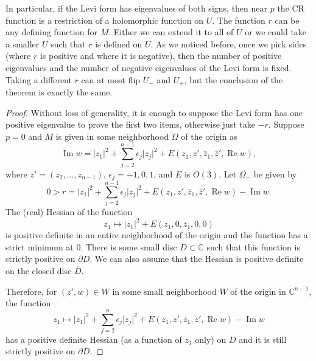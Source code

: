 \documentclass[12pt,openany]{book}
\renewcommand{\Re}{\operatorname{Re}}
\renewcommand{\Im}{\operatorname{Im}}
\newcommand{\sabs}[1]{\lvert {#1} \rvert}
\newcommand{\C}{{\mathbb{C}}}
\theoremstyle{plain}
\theoremstyle{remark}
\theoremstyle{definition}
\theoremstyle{exercise}
\theoremstyle{example}
\begin{document}
In particular, if the Levi form has eigenvalues of both signs,
then near $p$ the CR function is a restriction of a holomorphic
function on $U$.  The function $r$ can be any defining
function for $M$.  Either we can extend it to all of $U$ or we could take a
smaller $U$ such that $r$ is defined on $U$.  As we noticed before,
once we pick sides (where $r$ is positive and where it is negative), then
the number of positive eigenvalues and the number of negative eigenvalues of
the Levi form is fixed.  Taking a different $r$ can at most flip $U_-$
and $U_+$, but the conclusion of the theorem is exactly the same.

\begin{proof}
Without loss of generality, it is enough to suppose the Levi form has one positive eigenvalue to prove the
first two items, otherwise just take $-r$.
Suppose $p = 0$ and $M$ is given in some neighborhood
$\Omega$ of the origin as
\begin{equation*}
\Im w = \sabs{z_1}^2 + \sum_{j=2}^{n-1} \epsilon_j \sabs{z_j}^2 +
E(z_1,z',\bar{z}_1,\bar{z}',\Re w) ,
\end{equation*}
where $z' = (z_2,\ldots,z_{n-1})$, $\epsilon_j = -1,0,1$,
and $E$ is $O(3)$.
Let $\Omega_-$ be given by
\begin{equation*}
0 > r = \sabs{z_1}^2 + \sum_{j=2}^{n-1} \epsilon_j \sabs{z_j}^2 +
E(z_1,z',\bar{z}_1,\bar{z}',\Re w) - \Im w .
\end{equation*}
The (real) Hessian of the function
\begin{equation*}
z_1 \mapsto \sabs{z_1}^2 +
E(z_1,0,\bar{z}_1,0,0) 
\end{equation*}
is positive definite in an entire
neighborhood of the origin and the function has a strict minimum at 0.
There is some small disc $D \subset \C$ such
that this function is strictly positive on $\partial D$.  We can also assume
that the Hessian is positive definite on the closed disc $\overline{D}$.

Therefore,
for $(z',w) \in W$ in some small neighborhood $W$ of the origin in $\C^{n-1}$, the 
function
\begin{equation*}
z_1 \mapsto \sabs{z_1}^2 + \sum_{j=2}^n \epsilon_j \sabs{z_j}^2 +
E(z_1,z',\bar{z}_1,\bar{z}',\Re w) - \Im w
\end{equation*}
has a positive definite Hessian (as a function of $z_1$ only) on $D$ and
it is still strictly positive on $\partial D$.


\end{proof}
\end{document}
